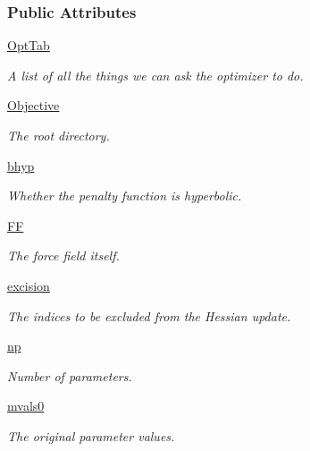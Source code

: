 \subsubsection*{Public Attributes}
\begin{DoxyCompactItemize}
\item 
\hyperlink{classforcebalance_1_1optimizer_1_1Optimizer_a30e7e28bf0af3cffc94aa51a58a3d345}{Opt\-Tab}
\begin{DoxyCompactList}\small\item\em A list of all the things we can ask the optimizer to do. \end{DoxyCompactList}\item 
\hyperlink{classforcebalance_1_1optimizer_1_1Optimizer_a485c636c02ff86bb7709a44582c7693e}{Objective}
\begin{DoxyCompactList}\small\item\em The root directory. \end{DoxyCompactList}\item 
\hyperlink{classforcebalance_1_1optimizer_1_1Optimizer_a83d94779674511a9d31b780b07ea54fb}{bhyp}
\begin{DoxyCompactList}\small\item\em Whether the penalty function is hyperbolic. \end{DoxyCompactList}\item 
\hyperlink{classforcebalance_1_1optimizer_1_1Optimizer_a873d6c3dfc5351d162613b596850af75}{F\-F}
\begin{DoxyCompactList}\small\item\em The force field itself. \end{DoxyCompactList}\item 
\hyperlink{classforcebalance_1_1optimizer_1_1Optimizer_a1040c03a6361d782db8bd6a273d445e5}{excision}
\begin{DoxyCompactList}\small\item\em The indices to be excluded from the Hessian update. \end{DoxyCompactList}\item 
\hyperlink{classforcebalance_1_1optimizer_1_1Optimizer_af198da71b849e8e10611bf16ea5914cf}{np}
\begin{DoxyCompactList}\small\item\em Number of parameters. \end{DoxyCompactList}\item 
\hyperlink{classforcebalance_1_1optimizer_1_1Optimizer_aa1d7f33ea1c9341fb1c867ef01752a16}{mvals0}
\begin{DoxyCompactList}\small\item\em The original parameter values. \end{DoxyCompactList}\item 

\end{DoxyCompactItemize}
